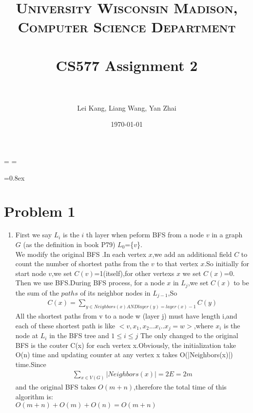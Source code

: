 \documentclass[paper=a4, fontsize=11pt]{scrartcl} %
\title{	
\normalfont \normalsize 
\textsc{University Wisconsin Madison, Computer Science Department} \\ [25pt] %
\horrule{0.5pt} \\[0.4cm] %
\huge CS577 Assignment 2\\ %
\horrule{2pt} \\[0.5cm] %
}
\author{Lei Kang, Liang Wang, Yan Zhai} %
\date{\normalsize\today} %
\numberwithin{equation}{section} %
\numberwithin{figure}{section} %
\numberwithin{table}{section} %
\begin{document}
\maketitle %

\singlespacing
\newdimen\origiwspc%
\newdimen\origiwstr%
\origiwspc=\font%
\origiwstr=\font

\font=0.8ex

\section*{Problem 1}

\begin{enumerate}[label={1.\arabic*}]
  \item 
First we say  $L_{i}$ is the ${i}$ th layer when peform BFS from a node ${v}$ in a graph ${G}$ (as the definition in book P79) $L_{0}$=\{${v}$\}.\\
We modify the original BFS .In each vertex ${x}$,we add an additional field ${C}$ to count the number of shortest paths from the ${v}$ to that vertex ${x}$.So initially for start node ${v}$,we set ${C(v)}$=1(itself),for other vertexs ${x}$
we set ${C(x)}$=0.\\
Then we use BFS.During BFS process, for a node ${x}$ in $L_{j}$,we set ${C(x)}$ to be the sum of the ${paths}$ of its neighbor nodes in $L_{j-1}$,So
\begin{align*}
 C(x) = \sum_{y \in Neighbors(x)  AND  layer(y)=layer(x)-1 } C(y)
\end{align*}
All the shortest paths from v to a node w (layer j) must have length i,and each of these shortest path is like
${<v,x_1,x_2...x_i..x_j=w>}$,where ${x_i}$ is the node at ${L_i}$ in the BFS tree and ${1 \leq i \leq j}$
The only changed to the original BFS is the couter C(x) for each vertex x.Obviously, the initialization take O(n)
time and updating counter at any vertex x takes O(|Neighbors(x)|) time.Since 
\begin{align*}
\sum_{x \in V(G) } |Neighbors(x)|=2E=2m
\end{align*}
and the original BFS takes ${O(m+n)}$,therefore the total time of this algorithm is:\\
${O(m+n)+O(m)+O(n)=O(m+n)}$

\end{enumerate}
\end{document}
